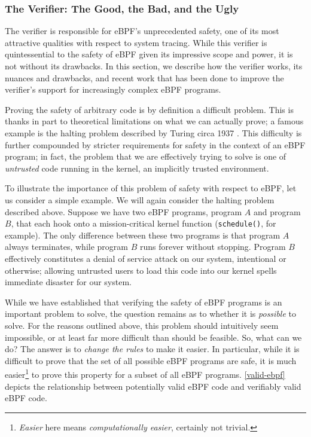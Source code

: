 \documentclass[
  12pt]{findlay}
\begin{document}
\FloatBarrier

\hypertarget{the-verifier-the-good-the-bad-and-the-ugly}{%
\subsubsection{The Verifier: The Good, the Bad, and the
Ugly}\label{the-verifier-the-good-the-bad-and-the-ugly}}

\label{verifier-section}

The verifier is responsible for eBPF's unprecedented safety, one of its
most attractive qualities with respect to system tracing. While this
verifier is quintessential to the safety of eBPF given its impressive
scope and power, it is not without its drawbacks. In this section, we
describe how the verifier works, its nuances and drawbacks, and recent
work that has been done to improve the verifier's support for
increasingly complex eBPF programs.

Proving the safety of arbitrary code is by definition a difficult
problem. This is thanks in part to theoretical limitations on what we
can actually prove; a famous example is the halting problem described by
Turing circa 1937 \autocite{turing37}. This difficulty is further
compounded by stricter requirements for safety in the context of an eBPF
program; in fact, the problem that we are effectively trying to solve is
one of \emph{untrusted} code running in the kernel, an implicitly
trusted environment.

To illustrate the importance of this problem of safety with respect to
eBPF, let us consider a simple example. We will again consider the
halting problem described above. Suppose we have two eBPF programs,
program \(A\) and program \(B\), that each hook onto a mission-critical
kernel function (\passthrough{\lstinline!schedule()!}, for example). The
only difference between these two programs is that program \(A\) always
terminates, while program \(B\) runs forever without stopping. Program
\(B\) effectively constitutes a denial of service attack
\autocite{hussain03} on our system, intentional or otherwise; allowing
untrusted users to load this code into our kernel spells immediate
disaster for our system.

While we have established that verifying the safety of eBPF programs is
an important problem to solve, the question remains as to whether it is
\emph{possible} to solve. For the reasons outlined above, this problem
should intuitively seem impossible, or at least far more difficult than
should be feasible. So, what can we do? The answer is to \emph{change
the rules} to make it easier. In particular, while it is difficult to
prove that the set of all possible eBPF programs are safe, it is much
easier\footnote{\emph{Easier}
here means \emph{computationally easier}, certainly not trivial.} to
prove this property for a subset of all eBPF programs.
\autoref{valid-ebpf} depicts the relationship between potentially valid
eBPF code and verifiably valid eBPF code.
\end{document}

